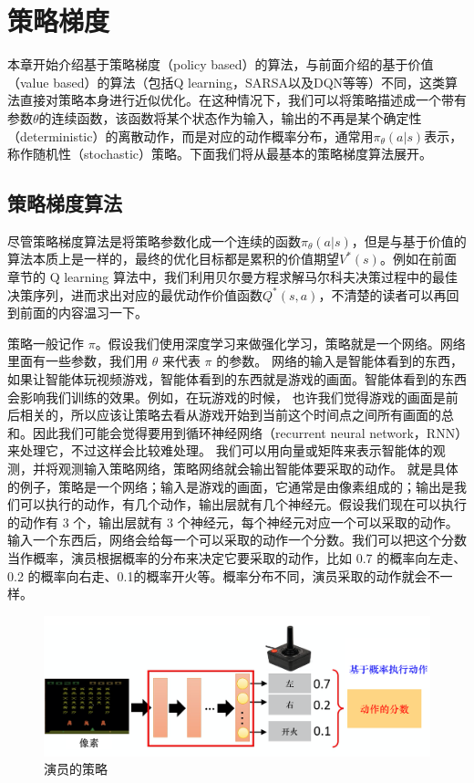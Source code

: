 \section{策略梯度}
本章开始介绍基于策略梯度（policy based）的算法，与前面介绍的基于价值（value based）的算法（包括Q learning，SARSA以及DQN等等）不同，这类算法直接对策略本身进行近似优化。在这种情况下，我们可以将策略描述成一个带有参数$\theta$的连续函数，该函数将某个状态作为输入，输出的不再是某个确定性（deterministic）的离散动作，而是对应的动作概率分布，通常用$\pi_{\theta}(a|s)$表示，称作随机性（stochastic）策略。下面我们将从最基本的策略梯度算法展开。

\subsection{策略梯度算法}

尽管策略梯度算法是将策略参数化成一个连续的函数$\pi_{\theta}(a|s)$，但是与基于价值的算法本质上是一样的，最终的优化目标都是累积的价值期望$V^{*}(s)$。例如在前面章节的 Q learning 算法中，我们利用贝尔曼方程求解马尔科夫决策过程中的最佳决策序列，进而求出对应的最优动作价值函数$Q^{*}(s,a)$，不清楚的读者可以再回到前面的内容温习一下。

策略一般记作 $\pi$。假设我们使用深度学习来做强化学习，策略就是一个网络。网络里面有一些参数，我们用 $\theta$ 来代表 $\pi$ 的参数。
网络的输入是智能体看到的东西，如果让智能体玩视频游戏，智能体看到的东西就是游戏的画面。智能体看到的东西会影响我们训练的效果。例如，在玩游戏的时候， 也许我们觉得游戏的画面是前后相关的，所以应该让策略去看从游戏开始到当前这个时间点之间所有画面的总和。因此我们可能会觉得要用到循环神经网络（recurrent neural network，RNN）来处理它，不过这样会比较难处理。
我们可以用向量或矩阵来表示智能体的观测，并将观测输入策略网络，策略网络就会输出智能体要采取的动作。
 就是具体的例子，策略是一个网络；输入是游戏的画面，它通常是由像素组成的；输出是我们可以执行的动作，有几个动作，输出层就有几个神经元。假设我们现在可以执行的动作有 3 个，输出层就有 3 个神经元，每个神经元对应一个可以采取的动作。输入一个东西后，网络会给每一个可以采取的动作一个分数。我们可以把这个分数当作概率，演员根据概率的分布来决定它要采取的动作，比如 0.7 的概率向左走、0.2 的概率向右走、0.1的概率开火等。概率分布不同，演员采取的动作就会不一样。

\begin{figure}[hbt]
    \centering
    \includegraphics[width=0.5\linewidth]{ch6/figs/actor_policy.png}
    \caption{演员的策略}
    \label{fig:actor_policy}
\end{figure}


